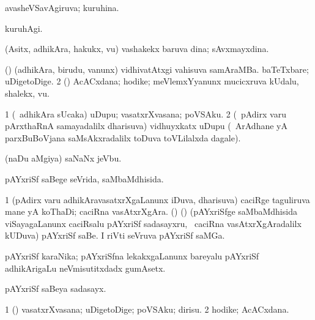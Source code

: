 \bentry
{} 
\gl{\gu}
\expl{}
\bmng
 avasheVSavAgiruva; kuruhina. 
\emng
\eentry

\bentry 
{} 
\gl{\kirxvi}
\expl{}
\bmng
 kuruhAgi. 
\emng
\eentry

\bentry
{}
\gl{\nA}
\expl{}
\bmng
 (Asitx, adhikAra, hakukx, \mo vu) vashakekx baruva dina; sAvxmayxdina. 
\emng
\eentry

\bentry
{} 
\gl{\nA}
\expl{}
\bmng
\bnum
{} (\pArxparx) 
\banum
{} (adhikAra, birudu, \mo vanunx) vidhivatAtxgi vahisuva samAraMBa. 
 baTeTxbare; uDigetoDige. 
\eanum
\numie
\num{2} (\pArxvi) AcACxdana; hodike; meVlemxYyanunx mucicxruva kUdalu, shalekx, \mo vu. 
\enum
\emng
\eentry

\bentry
{} 
\gl{\nA}
\expl{}
\bmng
\bnum
\num{1} (\kanmu\ adhikAra sUcaka) uDupu; vasatxrXvasana; poVSAku. 
\num{2} (\kanmu\ pAdirx \mo varu pArxthaRnA samayadalilx dharisuva) vidhuyxkatx uDupu (\kanmu\ ArAdhane yA parxBuBoVjana saMsAkxradalilx toDuva toVLilalxda dagale). 
\enum
\emng
\eentry

\bentry
{} 
\gl{\nA}
\expl{}
\bmng
 (naDu aMgiya) saNaNx jeVbu. 
\emng
\eentry

\bentry
{} 
\gl{\gu}
\expl{}
\bmng
 pAYxriSf saBege seVrida, saMbaMdhisida. 
\emng
\eentry

\bentry
{} 
\gl{\nA}
\bmng
\bnum
\num{1} (pAdirx \mo varu adhikAravasatxrXgaLanunx iDuva, dharisuva) caciRge taguliruva mane yA koThaDi; caciRna vasAtxrXgAra. 
 (\ca) (\birx) 
\banum
{} (pAYxriSfge saMbaMdhisida viSayagaLanunx caciRsalu pAYxriSf sadasayxru, \kanmu\ caciRna vasAtxrXgAradalilx kUDuva) pAYxriSf saBe. 
 I riVti seVruva pAYxriSf saMGa. 
\eanum
\numie
\enum
\emng
\eentry

\bentry
{} 
\gl{\nA}
\expl{}
\bmng
 pAYxriSf karaNika; pAYxriSfna lekakxgaLanunx bareyalu pAYxriSf adhikArigaLu neVmisutitxdadx gumAsetx. 
\emng
\eentry

\bentry
{} 
\gl{\nA}
\bmng
 pAYxriSf saBeya sadasayx. 
\emng
\eentry

\bentry
{} 
\gl{\nA}
\expl{}
\bmng
\bnum
\num{1} (\kAparx) vasatxrXvasana; uDigetoDige; poVSAku; dirisu. 
\num{2} hodike; AcACxdana. 
\enum
\emng
\eentry

